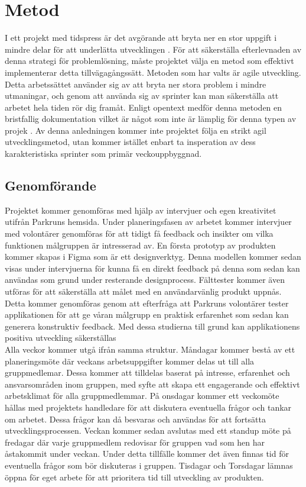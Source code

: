 \section{Metod}

I ett projekt med tidspress är det avgörande att bryta ner en stor uppgift i mindre delar för att underlätta utvecklingen \cite{agile}. För att säkerställa efterlevnaden av denna strategi för problemlösning, måste projektet välja en metod som effektivt implementerar detta tillvägagångssätt. Metoden som har valts är agile utveckling. Detta arbetssättet använder sig av att bryta ner stora problem i mindre utmaningar, och genom att använda sig av sprinter kan man säkerställa att arbetet hela tiden rör dig framåt. Enligt opentext medför denna metoden en bristfallig dokumentation vilket är något som inte är lämplig för denna typen av projek \cite{agile}.  Av denna anledningen kommer inte projektet följa en strikt agil utvecklingsmetod, utan kommer istället enbart ta insperation av dess karakteristiska sprinter som primär veckouppbyggnad.

\subsection{Genomförande}

Projektet kommer genomföras med hjälp av intervjuer och egen kreativitet utifrån Parkruns hemsida. Under planeringsfasen av arbetet kommer intervjuer med volontärer genomföras för att tidigt få feedback och insikter om vilka funktionen målgruppen är intresserad av. En första prototyp av produkten kommer skapas i Figma som är ett designverktyg. Denna modellen kommer sedan visas under intervjuerna för kunna få en direkt feedback på denna som sedan kan användas som grund under resterande designprocess. Fälttester kommer även utföras för att säkerställa att målet med en användarvänlig produkt uppnås. Detta kommer genomföras genom att efterfråga att Parkruns volontärer tester applikationen för att ge våran målgrupp en praktisk erfarenhet som sedan kan generera konstruktiv feedback. Med dessa studierna till grund kan applikationens positiva utveckling säkerställas\\

Alla veckor kommer utgå ifrån samma struktur. Måndagar kommer bestå av  ett planeringsmöte där veckans arbetsuppgifter kommer delas ut till alla gruppmedlemar. Dessa kommer att tilldelas baserat på intresse, erfarenhet och ansvarsområden inom gruppen, med syfte att skapa ett engagerande och effektivt arbetsklimat för alla gruppmedlemmar. På onsdagar kommer ett veckomöte hållas med projektets handledare för att diskutera eventuella frågor och tankar om arbetet. Dessa frågor kan då besvaras och användas för att fortsätta utvecklingsprocessen. Veckan kommer sedan avslutas med ett standup möte på fredagar där varje gruppmedlem redovisar för gruppen vad som hen har åstakommit under veckan. Under detta tillfälle kommer det även finnas tid för eventuella frågor som bör diskuteras i gruppen. Tisdagar och Torsdagar lämnas öppna för eget arbete för att prioritera tid till utveckling av produkten.\\

